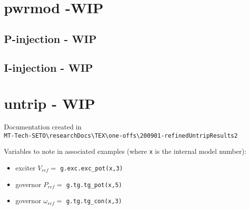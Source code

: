 \section{pwrmod -WIP} \label{sec: pwrmodExamples}
\subsection{P-injection - WIP}
\subsection{I-injection - WIP}


\section{untrip - WIP}
Documentation created in\\ \verb|MT-Tech-SETO\researchDocs\TEX\one-offs\200901-refinedUntripResults2|

Variables to note in associated examples (where \verb|x| is the internal model number):
\begin{itemize}
\item exciter $V_{ref} = $ \verb|g.exc.exc_pot(x,3)|
\item governor $P_{ref} = $ \verb|g.tg.tg_pot(x,5)|
\item governor $\omega_{ref} = $ \verb|g.tg.tg_con(x,3)|
\end{itemize}